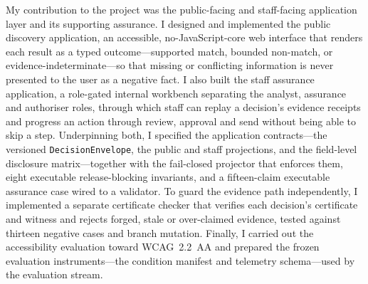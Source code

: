

My contribution to the project was the public-facing and staff-facing application layer and its
supporting assurance. I designed and implemented the public discovery application, an accessible,
no-JavaScript-core web interface that renders each result as a typed outcome---supported match,
bounded non-match, or evidence-indeterminate---so that missing or conflicting information is never
presented to the user as a negative fact. I also built the staff assurance application, a role-gated
internal workbench separating the analyst, assurance and authoriser roles, through which staff can
replay a decision's evidence receipts and progress an action through review, approval and send
without being able to skip a step. Underpinning both, I specified the application contracts---the
versioned \texttt{DecisionEnvelope}, the public and staff projections, and the field-level disclosure
matrix---together with the fail-closed projector that enforces them, eight executable
release-blocking invariants, and a fifteen-claim executable assurance case wired to a validator. To
guard the evidence path independently, I implemented a separate certificate checker that verifies
each decision's certificate and witness and rejects forged, stale or over-claimed evidence, tested
against thirteen negative cases and branch mutation. Finally, I carried out the accessibility
evaluation toward WCAG~2.2~AA and prepared the frozen evaluation instruments---the condition manifest
and telemetry schema---used by the evaluation stream.



